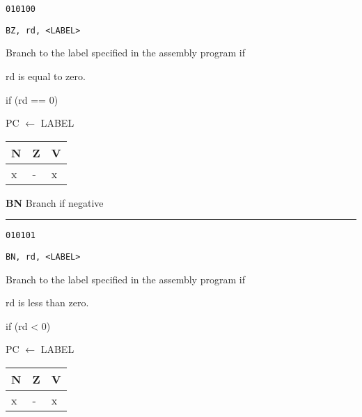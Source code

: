 \documentclass{article}
\begin{document}
{\large
	 \texttt{010100} \par
	\smallbreak
	 \texttt{BZ, rd, <LABEL>} \par
	\smallbreak
	 Branch to the label specified in the assembly program if  \par
	\makebox[3.5cm][l]{  } rd is equal to zero. \par
	\smallbreak
	 if (rd == 0) \par
	\makebox[3.5cm][l]{  } PC $\leftarrow$ LABEL \par
	\smallbreak
	 \begin{tabular}{lll} N \quad & Z \quad & V \\ \hline x & - & x \\ \end{tabular}
}

\pagebreak

\flushleft
\LARGE\textbf{BN} \large \hfill Branch if negative

\kern-3pt
\noindent\rule{16.5cm}{0.4pt}
\normalsize

{\large
	 \texttt{010101} \par
	\smallbreak
	 \texttt{BN, rd, <LABEL>} \par
	\smallbreak
	 Branch to the label specified in the assembly program if  \par
	\makebox[3.5cm][l]{  } rd is less than zero. \par
	\smallbreak
	 if (rd < 0)\par
	\makebox[3.5cm][l]{  } PC $\leftarrow$ LABEL \par
	\smallbreak
	 \begin{tabular}{lll} N \quad & Z \quad & V \\ \hline x & - & x \\ \end{tabular}
}
\end{document}
